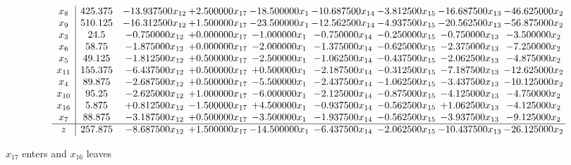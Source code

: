 \documentclass[10pt]{article}
\begin{document}
 \[\begin{array}{c| c c@{\hskip 2pt} c@{\hskip 2pt} c@{\hskip 2pt} c@{\hskip 2pt} c@{\hskip 2pt} c@{\hskip 2pt} c@{\hskip 2pt} }
 x_{8}   &  425.375 & -13.937500 x_{12} & + 2.500000 x_{17} & -18.500000 x_{1} & -10.687500 x_{14} & -3.812500 x_{15} & -16.687500 x_{13} & -46.625000 x_{2}\\
 x_{9}   &  510.125 & -16.312500 x_{12} & + 1.500000 x_{17} & -23.500000 x_{1} & -12.562500 x_{14} & -4.937500 x_{15} & -20.562500 x_{13} & -56.875000 x_{2}\\
 x_{3}   &  24.5 & -0.750000 x_{12} & + 0.000000 x_{17} & -1.000000 x_{1} & -0.750000 x_{14} & -0.250000 x_{15} & -0.750000 x_{13} & -3.500000 x_{2}\\
 x_{6}   &  58.75 & -1.875000 x_{12} & + 0.000000 x_{17} & -2.000000 x_{1} & -1.375000 x_{14} & -0.625000 x_{15} & -2.375000 x_{13} & -7.250000 x_{2}\\
 x_{5}   &  49.125 & -1.812500 x_{12} & + 0.500000 x_{17} & -2.500000 x_{1} & -1.062500 x_{14} & -0.437500 x_{15} & -2.062500 x_{13} & -4.875000 x_{2}\\
 x_{11}   &  155.375 & -6.437500 x_{12} & + 0.500000 x_{17} & + 0.500000 x_{1} & -2.187500 x_{14} & -0.312500 x_{15} & -7.187500 x_{13} & -12.625000 x_{2}\\
 x_{4}   &  89.875 & -2.687500 x_{12} & + 0.500000 x_{17} & -5.500000 x_{1} & -2.437500 x_{14} & -1.062500 x_{15} & -3.437500 x_{13} & -10.125000 x_{2}\\
 x_{10}   &  95.25 & -2.625000 x_{12} & + 1.000000 x_{17} & -6.000000 x_{1} & -2.125000 x_{14} & -0.875000 x_{15} & -4.125000 x_{13} & -4.750000 x_{2}\\
 x_{16}   &  5.875 & + 0.812500 x_{12} & -1.500000 x_{17} & + 4.500000 x_{1} & -0.937500 x_{14} & -0.562500 x_{15} & + 1.062500 x_{13} & -4.125000 x_{2}\\
 x_{7}   &  88.875 & -3.187500 x_{12} & + 0.500000 x_{17} & -3.500000 x_{1} & -1.937500 x_{14} & -0.562500 x_{15} & -3.937500 x_{13} & -9.125000 x_{2}\\
\hline
z    &  257.875 & -8.687500 x_{12} & + 1.500000 x_{17} & -14.500000 x_{1} & -6.437500 x_{14} & -2.062500 x_{15} & -10.437500 x_{13} & -26.125000 x_{2}\\
\end{array}\]


 $ x_{17} $ enters and $ x_{16} $ leaves 
\end{document}
